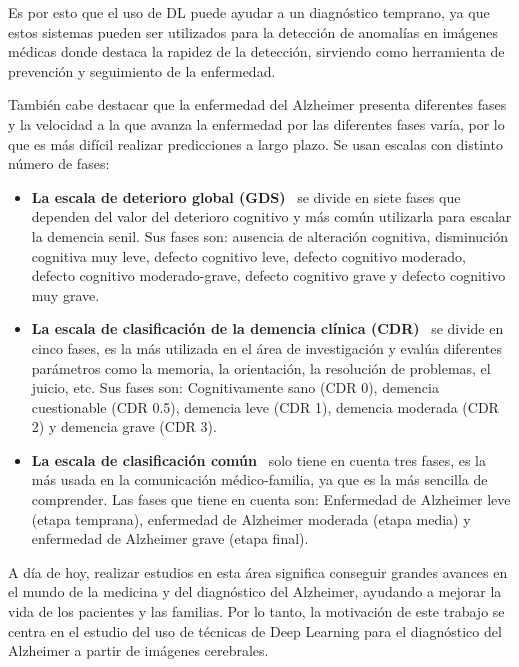 Es por esto que el uso de DL puede ayudar a un diagnóstico temprano, ya que estos sistemas pueden ser utilizados para la
detección de anomalías en imágenes médicas donde destaca la rapidez de la detección, sirviendo como herramienta de
prevención y seguimiento de la enfermedad.

También cabe destacar que la enfermedad del Alzheimer presenta diferentes fases y la velocidad a la que avanza la
enfermedad por las diferentes fases varía, por lo que es más difícil realizar predicciones a largo plazo.
Se usan escalas con distinto número de fases:
\begin{itemize}
    \item \textbf{La escala de deterioro global (GDS)}~\cite{gds} se divide en siete fases que dependen del valor del
    deterioro cognitivo y más común utilizarla para escalar la demencia senil.
    Sus fases son: ausencia de alteración cognitiva, disminución cognitiva muy leve, defecto cognitivo leve, defecto
    cognitivo moderado, defecto cognitivo moderado-grave, defecto cognitivo grave y defecto cognitivo muy grave.
    \item \textbf{La escala de clasificación de la demencia clínica (CDR)}~\cite{cdr} se divide en cinco fases, es la más
    utilizada en el área de investigación y evalúa diferentes parámetros como la memoria, la orientación, la resolución
    de problemas, el juicio, etc.
    Sus fases son: Cognitivamente sano (CDR 0), demencia cuestionable (CDR 0.5), demencia leve (CDR 1), demencia
    moderada (CDR 2) y demencia grave (CDR 3).
    \item \textbf{La escala de clasificación común}~\cite{alz-org-etapas} solo tiene en cuenta tres fases, es la más
    usada en la comunicación médico-familia, ya que es la más sencilla de comprender.
    Las fases que tiene en cuenta son: Enfermedad de Alzheimer leve (etapa temprana), enfermedad de Alzheimer moderada
    (etapa media) y enfermedad de Alzheimer grave (etapa final).\\
\end{itemize}

A día de hoy, realizar estudios en esta área significa conseguir grandes avances en el mundo de la medicina y del
diagnóstico del Alzheimer, ayudando a mejorar la vida de los pacientes y las familias.
Por lo tanto, la motivación de este trabajo se centra en el estudio del uso de técnicas de Deep Learning para el
diagnóstico del Alzheimer a partir de imágenes cerebrales.




